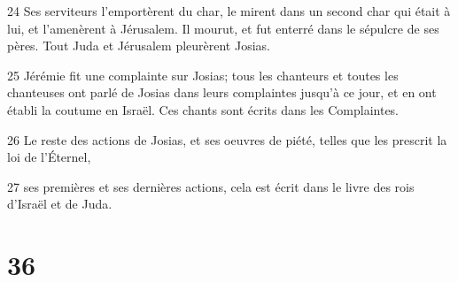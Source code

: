 \par 24 Ses serviteurs l'emportèrent du char, le mirent dans un second char qui était à lui, et l'amenèrent à Jérusalem. Il mourut, et fut enterré dans le sépulcre de ses pères. Tout Juda et Jérusalem pleurèrent Josias.
\par 25 Jérémie fit une complainte sur Josias; tous les chanteurs et toutes les chanteuses ont parlé de Josias dans leurs complaintes jusqu'à ce jour, et en ont établi la coutume en Israël. Ces chants sont écrits dans les Complaintes.
\par 26 Le reste des actions de Josias, et ses oeuvres de piété, telles que les prescrit la loi de l'Éternel,
\par 27 ses premières et ses dernières actions, cela est écrit dans le livre des rois d'Israël et de Juda.

\chapter{36}


